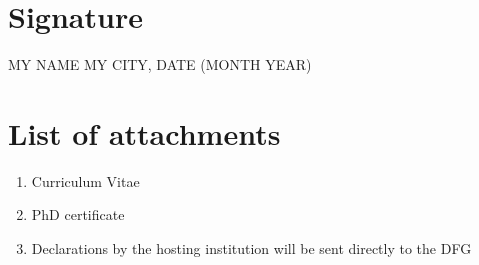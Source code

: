 \documentclass[a4paper,11pt]{article} %
\begin{document}
\section{Signature}

\hspace*{75pt} MY NAME \hfill MY CITY, DATE (MONTH YEAR)

\section{List of attachments}

\begin{enumerate}
  \item Curriculum Vitae
  \item PhD certificate
  \item Declarations by the hosting institution will be sent directly to the DFG
\end{enumerate}

\vfill
\end{document}

